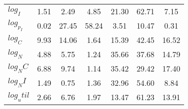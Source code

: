 \begin{center}
\begin{longtable}{lcccccc}
$log_I     $	 & 	        1.51	 & 	        2.49	 & 	        4.85	 & 	       21.30	 & 	       62.71	 & 	        7.15 \\ 
$log_p_I   $	 & 	        0.02	 & 	       27.45	 & 	       58.24	 & 	        3.51	 & 	       10.47	 & 	        0.31 \\ 
$log_C     $	 & 	        9.93	 & 	       14.06	 & 	        1.64	 & 	       15.39	 & 	       42.45	 & 	       16.52 \\ 
$log_N     $	 & 	        4.88	 & 	        5.75	 & 	        1.24	 & 	       35.66	 & 	       37.68	 & 	       14.79 \\ 
$log_NC    $	 & 	        6.88	 & 	        9.74	 & 	        1.14	 & 	       35.42	 & 	       29.42	 & 	       17.40 \\ 
$log_NI    $	 & 	        1.49	 & 	        0.75	 & 	        1.36	 & 	       32.96	 & 	       54.60	 & 	        8.84 \\ 
$log_util  $	 & 	        2.66	 & 	        6.76	 & 	        1.97	 & 	       13.47	 & 	       61.23	 & 	       13.91 \\ 
\end{longtable}
 \end{center}
